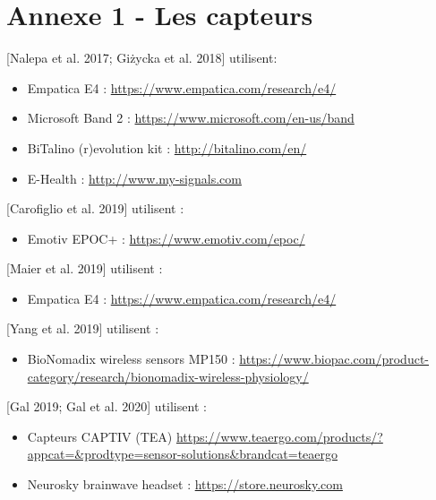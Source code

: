 \documentclass{article}
\begin{document}
\section{Annexe 1 - Les capteurs}\label{app:annexe1}
    [Nalepa et al. 2017; Giżycka et al. 2018] utilisent:
    \begin{itemize}
        \item Empatica E4 : \href{https://www.empatica.com/research/e4/}{https://www.empatica.com/research/e4/}
        \item Microsoft Band 2 : \href{https://www.microsoft.com/en-us/band}{https://www.microsoft.com/en-us/band}
        \item BiTalino (r)evolution kit : \href{http://bitalino.com/en/}{http://bitalino.com/en/}
        \item E-Health : \href{http://www.my-signals.com}{http://www.my-signals.com}
    \end{itemize}
    [Carofiglio et al. 2019] utilisent :
    \begin{itemize}
        \item Emotiv EPOC+ : \href{https://www.emotiv.com/epoc/}{https://www.emotiv.com/epoc/}
    \end{itemize}
    [Maier et al. 2019] utilisent :
    \begin{itemize}
        \item Empatica E4 : \href{https://www.empatica.com/research/e4/}{https://www.empatica.com/research/e4/}
    \end{itemize}
    [Yang et al. 2019] utilisent :
    \begin{itemize}
        \item BioNomadix wireless sensors MP150 : \href{https://www.biopac.com/product-category/research/bionomadix-wireless-physiology/}{https://www.biopac.com/product-category/research/\newline bionomadix-wireless-physiology/}
    \end{itemize} 
    [Gal 2019; Gal et al. 2020] utilisent : 
    \begin{itemize}
        \item Capteurs CAPTIV (TEA) \href{https://www.teaergo.com/products/?appcat=&prodtype=sensor-solutions&brandcat=teaergo}{https://www.teaergo.com/products/?appcat=\&prodtype=sensor-\newline solutions\&brandcat=teaergo}
        \item Neurosky brainwave headset : \href{https://store.neurosky.com}{https://store.neurosky.com}
    \end{itemize}

\medskip


\end{document}

